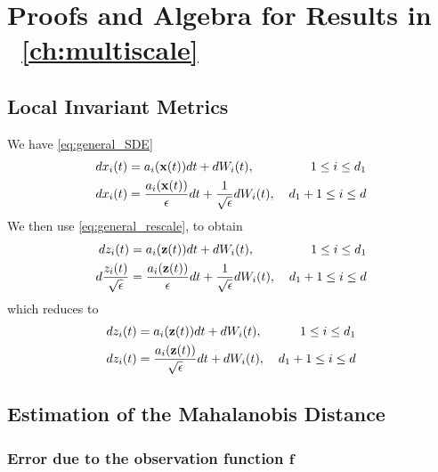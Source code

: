 
\chapter{Proofs and Algebra for Results in \chap~\ref{ch:multiscale} \label{app:multiscale}}

\graphicspath{{ch-multiscale/figures/}}

\section{Local Invariant Metrics}

We have \eqref{eq:general_SDE}
\begin{equation}
\begin{aligned}
dx_i(t) &= a_i(\mathbf{x}(t)) dt + dW_i(t), & \: 1 \le i \le {d_1} \\
dx_i(t) &= \frac{a_i(\mathbf{x}(t))}{\epsilon} dt + \frac{1}{\sqrt{\epsilon}} dW_i(t) , & \: {d_1}+1 \le i \le d
\end{aligned}
\end{equation}
%
We then use \eqref{eq:general_rescale}, to obtain
%
\begin{equation}
\begin{aligned}
d z_i(t) &= a_i(\mathbf{z}(t)) dt + dW_i(t), & \: 1 \le i \le {d_1} \\
d \frac{z_i(t)}{\sqrt{\epsilon}} &= \frac{a_i(\mathbf{z}(t))}{\epsilon} dt + \frac{1}{\sqrt{\epsilon}} dW_i(t) , & \: {d_1}+1 \le i \le d
\end{aligned}
\end{equation}
%
which reduces to
%
\begin{equation}
\begin{aligned}
d z_i(t) &= a_i(\mathbf{z}(t)) dt + dW_i(t), & \: 1 \le i \le {d_1} \\
d z_i(t) &= \frac{a_i(\mathbf{z}(t))}{\sqrt{\epsilon}} dt + dW_i(t) , & \: {d_1}+1 \le i \le d
\end{aligned}
\end{equation}

\section{Estimation of the Mahalanobis Distance}

\subsection{Error due to the observation function $\mathbf{f}$}

